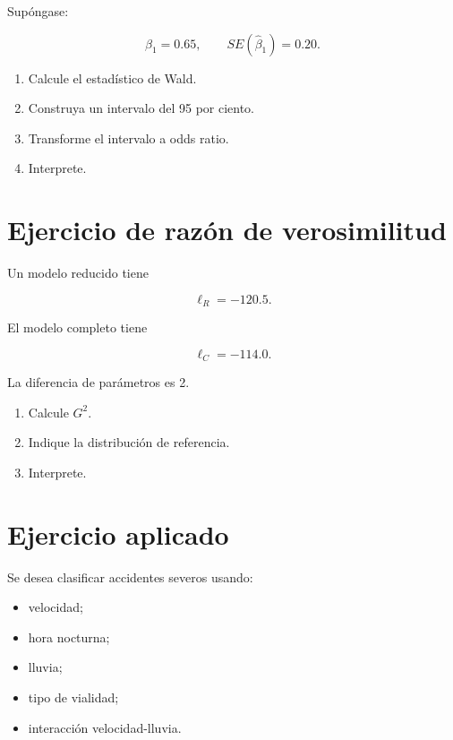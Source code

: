 \documentclass[
  spanish,
  10.5pt,
  letterpaper,
  DIV=11,
  numbers=noendperiod,
  oneside,
  open=any]{scrreprt}
\providecommand{\tightlist}{%
  \setlength{\itemsep}{0pt}\setlength{\parskip}{0pt}}
\theoremstyle{definition}
\theoremstyle{definition}
\theoremstyle{plain}
\theoremstyle{remark}
\begin{document}

Supóngase:

\[
\widehat{\beta}_1=0.65,
\qquad
SE(\widehat{\beta}_1)=0.20.
\]

\begin{enumerate}
\def\labelenumi{\arabic{enumi}.}
\tightlist
\item
  Calcule el estadístico de Wald.
\item
  Construya un intervalo del 95 por ciento.
\item
  Transforme el intervalo a odds ratio.
\item
  Interprete.
\end{enumerate}

\section*{Ejercicio de razón de
verosimilitud}\label{ejercicio-de-razuxf3n-de-verosimilitud}


Un modelo reducido tiene

\[
\ell_R=-120.5.
\]

El modelo completo tiene

\[
\ell_C=-114.0.
\]

La diferencia de parámetros es 2.

\begin{enumerate}
\def\labelenumi{\arabic{enumi}.}
\tightlist
\item
  Calcule \(G^2\).
\item
  Indique la distribución de referencia.
\item
  Interprete.
\end{enumerate}

\section*{Ejercicio aplicado}\label{ejercicio-aplicado-7}


Se desea clasificar accidentes severos usando:

\begin{itemize}
\tightlist
\item
  velocidad;
\item
  hora nocturna;
\item
  lluvia;
\item
  tipo de vialidad;
\item
  interacción velocidad-lluvia.
\end{itemize}
\end{document}
